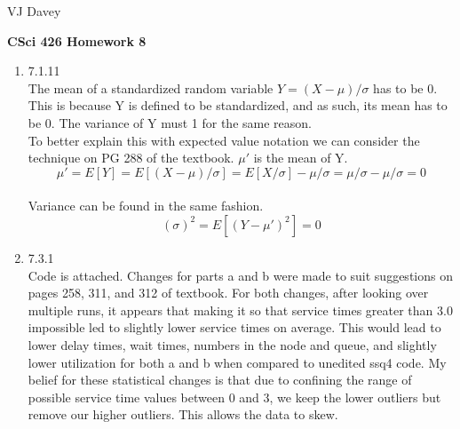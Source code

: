 \documentclass[11pt]{article}
\begin{document}
\centerline{VJ Davey}\vskip 0.10cm
\begin{LARGE}
\centerline {\bf CSci 426 Homework 8}
\end{LARGE}
\vskip 0.25cm
\begin{enumerate}
	\item 7.1.11
	\\The mean of a standardized random variable $Y=(X-\mu)/\sigma$ has to be 0. This is because Y is defined to be standardized, and as such, its mean has to be 0. The variance of Y must 1 for the same reason. 
	\\To better explain this with expected value notation we can consider the technique on PG 288 of the textbook. $\mu'$ is the mean of Y.
	$$\mu' = E[Y] = E[(X-\mu)/\sigma] = E[X/\sigma] - \mu/\sigma = \mu/\sigma - \mu/\sigma= 0 $$
	\\Variance can be found in the same fashion. 
	$$(\sigma)^2 = E[(Y - \mu')^2] = 0$$
	
	
	\item 7.3.1
	\\Code is attached. Changes for parts a and b were made to suit suggestions on pages 258, 311, and 312 of textbook. For both changes, after looking over multiple runs, it appears that making it so that service times greater than 3.0 impossible led to slightly lower service times on average. This would lead to lower delay times, wait times, numbers in the node and queue, and slightly lower utilization for both a and b when compared to unedited ssq4 code. My belief for these statistical changes is that due to confining the range of possible service time values between 0 and 3, we keep the lower outliers but remove our higher outliers. This allows the data to skew.
\end{enumerate}
\end{document}
